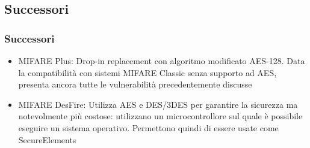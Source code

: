 \subsection{Successori}
\begin{frame}
    \frametitle{Successori}
    \begin{itemize}
        \item <1-> MIFARE Plus: Drop-in replacement con algoritmo modificato AES-128. Data la compatibilità con sistemi MIFARE Classic senza supporto ad AES, presenta ancora tutte le vulnerabilità precedentemente discusse
        \item <2-> MIFARE DesFire: Utilizza AES e DES/3DES per garantire la sicurezza ma notevolmente più costose: utilizzano un microcontrollore sul quale è possibile eseguire un sistema operativo. Permettono quindi di essere usate come SecureElements
    \end{itemize}
\end{frame}